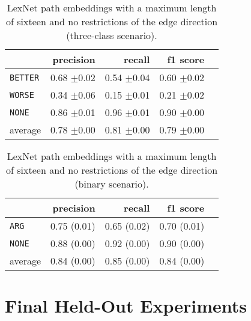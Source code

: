 	\begin{table}[h] 
		\centering 
		\caption{LexNet path embeddings with a maximum length of sixteen and no restrictions of the edge direction (three-class scenario).} 
		\label{  }
		\begin{tabular}{@{}lrrrr@{}}
			\toprule
			        & precision                & recall                   & f1 score                 \\ \midrule 
\texttt	{BETTER}&	 0.68 \scriptsize{$\pm$0.02} &	 0.54 \scriptsize{$\pm$0.04} &	 0.60 \scriptsize{$\pm$0.02}  \\ 
\texttt	{WORSE}	&	 0.34 \scriptsize{$\pm$0.06} &	 0.15 \scriptsize{$\pm$0.01} &	 0.21 \scriptsize{$\pm$0.02}  \\ 
\texttt	{NONE}	&	 0.86 \scriptsize{$\pm$0.01} &	 0.96 \scriptsize{$\pm$0.01} &	 0.90 \scriptsize{$\pm$0.00}  \\ 
average	&	 0.78 \scriptsize{$\pm$0.00} &	 0.81 \scriptsize{$\pm$0.00} &	 0.79 \scriptsize{$\pm$0.00}  \\ 
			\bottomrule
		\end{tabular}
	\end{table}
	
	\begin{table}[h] 
		\centering 
		\caption{LexNet path embeddings with a maximum length of sixteen and no restrictions of the edge direction (binary scenario).} 
		\label{  }
		\begin{tabular}{@{}lrrrr@{}}
			\toprule
			        & precision                & recall                   & f1 score                 \\ \midrule 
			\texttt{ARG}     & 0.75 \scriptsize{(0.01)} & 0.65 \scriptsize{(0.02)} & 0.70 \scriptsize{(0.01)} \\ 
			\texttt{NONE}    & 0.88 \scriptsize{(0.00)} & 0.92 \scriptsize{(0.00)} & 0.90 \scriptsize{(0.00)} \\ 
			average & 0.84 \scriptsize{(0.00)} & 0.85 \scriptsize{(0.00)} & 0.84 \scriptsize{(0.00)} \\ 
			\bottomrule
		\end{tabular}
	\end{table}
	
\section{Final Held-Out Experiments}
